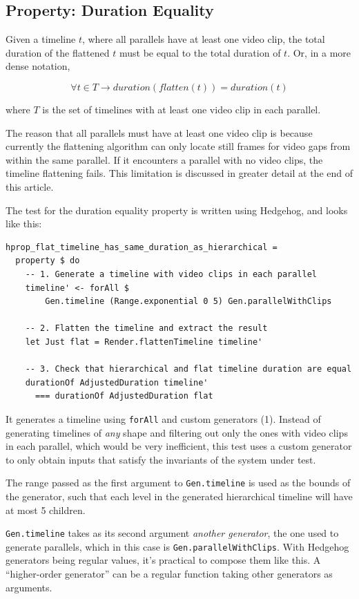 \subsection{Property: Duration Equality}


Given a timeline $t$, where all parallels have at least one video clip, the total duration of the flattened $t$  must be equal to the total duration of $t$. Or, in a more dense notation,

$$\forall t \in T \to duration(flatten(t)) = duration(t)$$

where $T$ is the set of timelines with at least one video clip in each parallel.

The reason that all parallels must have at least one video clip is because currently the flattening algorithm can only locate still frames for video gaps from within the same parallel. If it encounters a parallel with no video clips, the timeline flattening fails. This limitation is discussed in greater detail at the end of this article.

The test for the duration equality property is written using Hedgehog, and looks like this:

\begin{verbatim}
hprop_flat_timeline_has_same_duration_as_hierarchical =
  property $ do
    -- 1. Generate a timeline with video clips in each parallel
    timeline' <- forAll $
        Gen.timeline (Range.exponential 0 5) Gen.parallelWithClips
  
    -- 2. Flatten the timeline and extract the result
    let Just flat = Render.flattenTimeline timeline'
    
    -- 3. Check that hierarchical and flat timeline duration are equal
    durationOf AdjustedDuration timeline'
      === durationOf AdjustedDuration flat
\end{verbatim}
It generates a timeline using \texttt{forAll} and custom generators (1). Instead of generating timelines of \textit{any} shape and filtering out only the ones with video clips in each parallel, which would be very inefficient, this test uses a custom generator to only obtain inputs that satisfy the invariants of the system under test.

The range passed as the first argument to \texttt{Gen.timeline} is used as the bounds of the generator, such that each level in the generated hierarchical timeline will have at most 5 children.

\texttt{Gen.timeline} takes as its second argument \textit{another generator}, the one used to generate parallels, which in this case is \texttt{Gen.parallelWithClips}. With Hedgehog generators being regular values, it's practical to compose them like this. A ``higher-order generator'' can be a regular function taking other generators as arguments.

